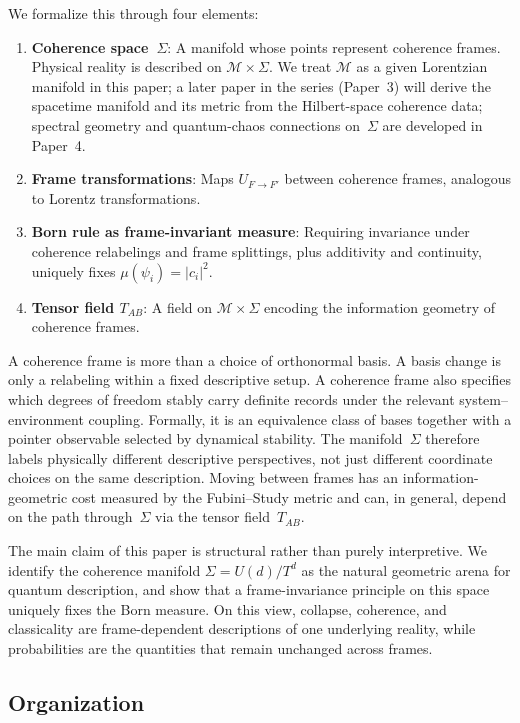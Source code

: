 \documentclass[aps,prd,twocolumn,superscriptaddress,nofootinbib,floatfix]{revtex4-2}
\newcommand{\Sig}{\Sigma}
\newcommand{\Tab}{T_{AB}}
\begin{document}
We formalize this through four elements:
\begin{enumerate}
\item \textbf{Coherence space~$\Sig$}: A manifold whose points represent coherence frames. Physical reality is described on $\mathcal{M} \times \Sig$. We treat $\mathcal{M}$ as a given Lorentzian manifold in this paper; a later paper in the series (Paper~3) will derive the spacetime manifold and its metric from the Hilbert-space coherence data; spectral geometry and quantum-chaos connections on~$\Sig$ are developed in Paper~4.
\item \textbf{Frame transformations}: Maps $U_{F \to F'}$ between coherence frames, analogous to Lorentz transformations.
\item \textbf{Born rule as frame-invariant measure}: Requiring invariance under coherence relabelings and frame splittings, plus additivity and continuity, uniquely fixes $\mu(\psi_i) = |c_i|^2$.
\item \textbf{Tensor field $\Tab$}: A field on $\mathcal{M} \times \Sig$ encoding the information geometry of coherence frames.
\end{enumerate}

A coherence frame is more than a choice of orthonormal basis. A basis change is only a relabeling within a fixed descriptive setup. A coherence frame also specifies which degrees of freedom stably carry definite records under the relevant system--environment coupling. Formally, it is an equivalence class of bases together with a pointer observable selected by dynamical stability. The manifold~$\Sig$ therefore labels physically different descriptive perspectives, not just different coordinate choices on the same description. Moving between frames has an information-geometric cost measured by the Fubini--Study metric and can, in general, depend on the path through~$\Sig$ via the tensor field~$\Tab$.

The main claim of this paper is structural rather than purely interpretive. We identify the coherence manifold $\Sig = U(d)/T^d$ as the natural geometric arena for quantum description, and show that a frame-invariance principle on this space uniquely fixes the Born measure. On this view, collapse, coherence, and classicality are frame-dependent descriptions of one underlying reality, while probabilities are the quantities that remain unchanged across frames.

\subsection{Organization}
\end{document}
